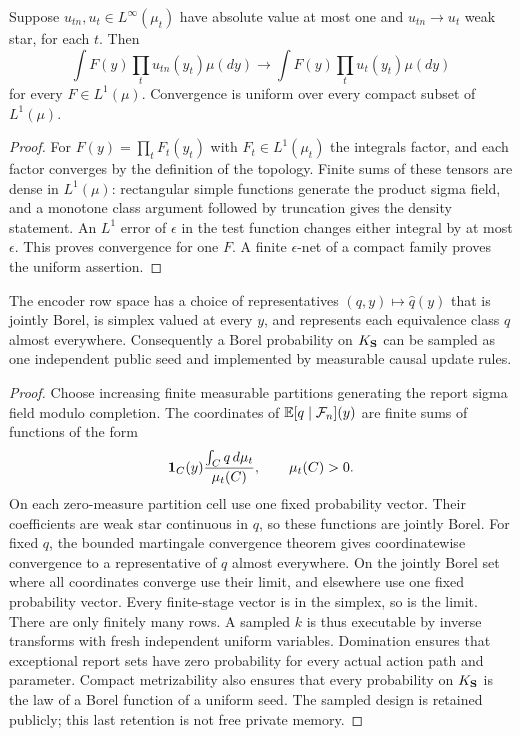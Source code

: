 \begin{lemma}\label{lem:v10-tensor}
Suppose $u_{tn},u_t\in L^\infty(\mu_t)$ have absolute value at most one
and $u_{tn}\to u_t$ weak star, for each $t$. Then
\[
 \int F(y)\prod_t u_{tn}(y_t)\mu(dy)
 \longrightarrow \int F(y)\prod_t u_t(y_t)\mu(dy)
\]
for every $F\in L^1(\mu)$. Convergence is uniform over every compact
subset of $L^1(\mu)$.
\end{lemma}
\begin{proof}
For $F(y)=\prod_t F_t(y_t)$ with $F_t\in L^1(\mu_t)$ the integrals
factor, and each factor converges by the definition of the topology.
Finite sums of these tensors are dense in $L^1(\mu)$: rectangular
simple functions generate the product sigma field, and a monotone
class argument followed by truncation gives the density statement.
An $L^1$ error of $\epsilon$ in the test function changes either
integral by at most $\epsilon$. This proves convergence for one $F$.
A finite $\epsilon$-net of a compact family proves the uniform assertion.
\end{proof}

\begin{lemma}\label{lem:v10-representatives}
The encoder row space has a choice of representatives $(q,y)\mapsto
\widehat q(y)$ that is jointly Borel, is simplex valued at every $y$,
and represents each equivalence class $q$ almost everywhere. Consequently
a Borel probability on $K_{\bf S}$ can be sampled as one independent
public seed and implemented by measurable causal update rules.
\end{lemma}
\begin{proof}
Choose increasing finite measurable partitions generating the report
sigma field modulo completion. The coordinates of
$\mathbb E[q\mid\mathcal F_n](y)$ are finite sums of functions of the form
\[
 \mathbf 1_C(y)\frac{\int_C q\,d\mu_t}{\mu_t(C)},\qquad \mu_t(C)>0.
\]
On each zero-measure partition cell use one fixed probability vector.
Their coefficients are weak star continuous in $q$, so these functions
are jointly Borel. For fixed $q$, the bounded martingale convergence
theorem gives coordinatewise convergence to a representative of $q$
almost everywhere. On the jointly Borel set where all coordinates
converge use their limit, and elsewhere use one fixed probability
vector. Every finite-stage vector is in the simplex, so is the limit.
There are only finitely many rows. A sampled $k$ is thus executable
by inverse transforms with fresh independent uniform variables.
Domination ensures that exceptional report sets have zero probability
for every actual action path and parameter. Compact metrizability also
ensures that every probability on $K_{\bf S}$ is the law of a Borel
function of a uniform seed. The sampled design is retained publicly;
this last retention is not free private memory.
\end{proof}

